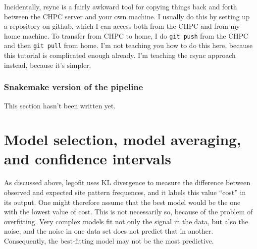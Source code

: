 \documentclass[11pt]{article}
\begin{document}
Incidentally, rsync is a fairly awkward tool for copying things back
and forth between the CHPC server and your own machine. I usually do
this by setting up a repository on github, which I can access both
from the CHPC and from my home machine. To transfer from CHPC to home,
I do \texttt{git push} from the CHPC and then \texttt{git pull} from
home. I'm not teaching you how to do this here, because this tutorial
is complicated enough already. I'm teaching the rsync approach
instead, because it's simpler.

\subsubsection{Snakemake version of the pipeline}
\label{sec.snakemake}
This section hasn't been written yet.

\section{Model selection, model averaging, and confidence intervals}
\label{sec.msma}
As discussed above, legofit uses KL divergence to measure the
difference between observed and expected site pattern frequences, and
it labels this value ``cost'' in its output. One might therefore
assume that the best model would be the one with the lowest value of
cost. This is not necessarily so, because of the problem of
\href{https://en.wikipedia.org/wiki/Overfitting}{overfitting}. Very
complex models fit not only the signal in the data, but also the
noise, and the noise in one data set does not predict that in
another. Consequently, the best-fitting model may not be the most
predictive.
\end{document}

